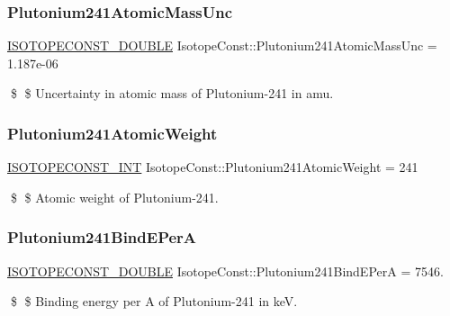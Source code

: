 \subsubsection{\texorpdfstring{Plutonium241\+Atomic\+Mass\+Unc}{Plutonium241AtomicMassUnc}}
{\footnotesize\ttfamily \mbox{\hyperlink{group___isotope_const-_macros_ga8f45a7272ce02c0b4c65c44636ed719a}{I\+S\+O\+T\+O\+P\+E\+C\+O\+N\+S\+T\+\_\+\+D\+O\+U\+B\+LE}} Isotope\+Const\+::\+Plutonium241\+Atomic\+Mass\+Unc = 1.\+187e-\/06}

\$ \$ Uncertainty in atomic mass of Plutonium-\/241 in amu. \mbox{\label{group___isotope_const-_plutonium-_pu241_gac76ecdc63e723a2dd29f973cbecbda40}} 
\subsubsection{\texorpdfstring{Plutonium241\+Atomic\+Weight}{Plutonium241AtomicWeight}}
{\footnotesize\ttfamily \mbox{\hyperlink{group___isotope_const-_macros_ga5f18360b3e99483a35c32d789e62621c}{I\+S\+O\+T\+O\+P\+E\+C\+O\+N\+S\+T\+\_\+\+I\+NT}} Isotope\+Const\+::\+Plutonium241\+Atomic\+Weight = 241}

\$ \$ Atomic weight of Plutonium-\/241. \mbox{\label{group___isotope_const-_plutonium-_pu241_ga4c1036d3a51572d4b7813d3652d5b80b}} 
\subsubsection{\texorpdfstring{Plutonium241\+Bind\+E\+PerA}{Plutonium241BindEPerA}}
{\footnotesize\ttfamily \mbox{\hyperlink{group___isotope_const-_macros_ga8f45a7272ce02c0b4c65c44636ed719a}{I\+S\+O\+T\+O\+P\+E\+C\+O\+N\+S\+T\+\_\+\+D\+O\+U\+B\+LE}} Isotope\+Const\+::\+Plutonium241\+Bind\+E\+PerA = 7546.}

\$ \$ Binding energy per A of Plutonium-\/241 in keV. \mbox{\label{group___isotope_const-_plutonium-_pu241_ga6a7cc38d503d627ec6bdf5b3d9c4453f}} 
